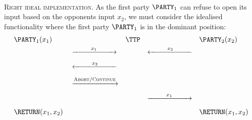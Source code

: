 \documentclass{crypto-exercise}
\begin{document}
\begin{solution}
\ \\
\textsc{Right ideal implementation.}
As the first party $\PARTY_1$ can refuse to open its input based on the opponents input $x_2$, we must consider the  idealised functionality where the first party $\PARTY_1$ is in the dominant position:
\begin{align*}
&\PARTY_1(x_1) &&&& \TTP  &&&&\PARTY_2(x_2) \\
&&&\xrightarrow[\hspace*{2cm}]{x_1}
&&&\xleftarrow[\hspace*{2cm}]{x_2}\\
&&&\xleftarrow[\hspace*{2cm}]{x_2}\\
&&&\xrightarrow[\hspace*{2cm}]{\textsc{Abort}/\textsc{Continue}}\\
&&&&&&\xrightarrow[\hspace*{2cm}]{x_1}\\
&\RETURN (x_1,x_2)
&&&&&&&&\RETURN (x_1,x_2)
\end{align*}


\end{solution}
\end{document}

